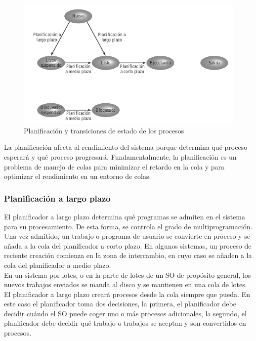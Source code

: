 \documentclass{article}
\begin{document}
				\begin{figure}
				\caption{Planificación y transiciones de estado de los procesos}
				\label{figura2.21:planificación y transiciones}
				\centering
				\includegraphics[width=1\textwidth, scale=1]{tema_2_figura21.png}
				\end{figure}
				
				La planificación afecta al rendimiento del sistema porque determina qué proceso esperará y qué proceso progresará. Fundamentalmente, la planificación es un problema de manejo de colas para minimizar el retardo en la cola y para optimizar el rendimiento en un entorno de colas.
				
			\subsubsection{Planificación a largo plazo}
				El planificador a largo plazo determina qué programas se admiten en el sistema para su procesamiento. De esta forma, se controla el grado de multiprogramación. Una vez admitido, un trabajo o programa de usuario se convierte en proceso y se añada a la cola del planificador a corto plazo. En algunos sistemas, un proceso de reciente creación comienza en la zona de intercambio, en cuyo caso se añaden a la cola del planificador a medio plazo. \\
				
				En un sistema por lotes, o en la parte de lotes de un SO de propósito general, los nuevos trabajos enviados se manda al disco y se mantienen en una cola de lotes. El planificador a largo plazo creará procesos desde la cola siempre que pueda. En este caso el planificador toma dos decisiones, la primera, el planificador debe decidir cuándo el SO puede coger uno o más procesos adicionales, la segundo, el planificador debe decidir qué trabajo o trabajos se aceptan y son convertidos en procesos. \\
				
\end{document}
